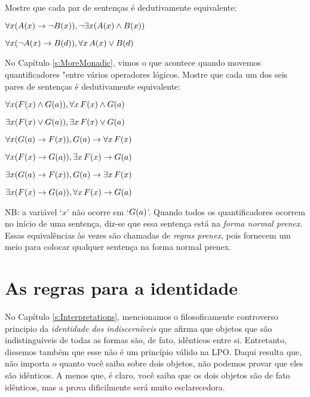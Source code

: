 \problempart
Mostre que cada par de senten\c cas \'e dedutivamente equivalente:
\begin{earg}
\item $\forall x (\mathord{A}(x)\rightarrow \neg \mathord{B}(x)), \neg\exists x(\mathord{A}(x) \wedge \mathord{B}(x))$
\item $\forall x (\neg\mathord{A}(x)\rightarrow \mathord{B}(d)), \forall x\,\mathord{A}(x) \vee \mathord{B}(d)$
\end{earg}

\problempart
No Capítulo \ref{s:MoreMonadic}, vimos o que acontece quando movemos quantificadores "entre  v\'arios operadores l\'ogicos. Mostre que cada um dos seis pares de senten\c cas \'e dedutivamente equivalente:
\begin{earg}
\item $\forall x(\mathord{F}(x) \wedge \mathord{G}(a)), \forall x\,\mathord{F}(x) \wedge \mathord{G}(a)$
\item $\exists x(\mathord{F}(x) \vee \mathord{G}(a)), \exists x\,\mathord{F}(x) \vee \mathord{G}(a)$
\item $\forall x(\mathord{G}(a) \rightarrow \mathord{F}(x)), \mathord{G}(a) \rightarrow \forall x\,\mathord{F}(x)$
\item $\forall x(\mathord{F}(x) \rightarrow \mathord{G}(a)), \exists x\,\mathord{F}(x) \rightarrow \mathord{G}(a)$
\item $\exists x(\mathord{G}(a) \rightarrow \mathord{F}(x)), \mathord{G}(a) \rightarrow \exists x\,\mathord{F}(x)$
\item $\exists x(\mathord{F}(x) \rightarrow \mathord{G}(a)), \forall x\,\mathord{F}(x) \rightarrow \mathord{G}(a)$
\end{earg}
NB: a vari\'avel `$x$'  n\~ao ocorre em `$\mathord{G}(a)$'. Quando todos os quantificadores ocorrem no in\'icio de uma senten\c ca, diz-se que essa senten\c ca est\'a na  \emph{forma normal prenex}. Essas equival\^encias \`as vezes s\~ao chamadas de  \emph{regras prenex}, pois fornecem um meio para colocar qualquer senten\c ca na forma normal prenex.


\chapter{As regras para a identidade}
 No Capítulo  \ref{s:Interpretations},  mencionamos o filosoficamente controverso   principio da \emph{identidade dos indiscern\'iveis} que afirma que objetos que s\~ao indistingu\'iveis de todas as formas s\~ao, de fato, id\^enticos entre si. Entretanto, dissemos tamb\'em que esse n\~ao \'e um princ\'ipio v\'alido na LPO.  Daqui resulta que, n\~ao importa o quanto voc\^e saiba sobre dois objetos, n\~ao podemos provar que eles s\~ao id\^enticos. A menos que, \'e claro, voc\^e saiba que os dois objetos s\~ao de fato id\^enticos, mas a prova dificilmente ser\'a muito esclarecedora.

